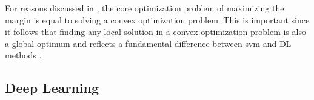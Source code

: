 For reasons discussed in \textcite{foundationof, natureofstat}, the core optimization problem of maximizing the margin is equal to solving a convex optimization problem. This is important since it follows that finding any local solution in a convex optimization problem is also a global optimum and reflects a fundamental difference between \gls{svm} and \gls{DL} methods \autocite{bishop2006pattern}. \\
















\subsection{Deep Learning}



